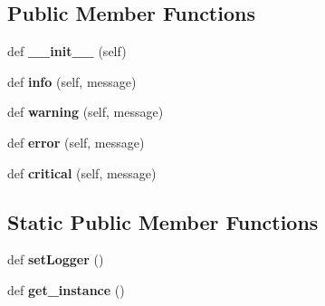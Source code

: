 \subsection*{Public Member Functions}
\begin{DoxyCompactItemize}
\item 
\hypertarget{classsrc_1_1fr_1_1tagc_1_1rainet_1_1core_1_1util_1_1log_1_1Logger_1_1Logger_a8b8db38c1df07ebf8eda30acc9213f04}{}def {\bfseries \+\_\+\+\_\+init\+\_\+\+\_\+} (self)\label{classsrc_1_1fr_1_1tagc_1_1rainet_1_1core_1_1util_1_1log_1_1Logger_1_1Logger_a8b8db38c1df07ebf8eda30acc9213f04}

\item 
\hypertarget{classsrc_1_1fr_1_1tagc_1_1rainet_1_1core_1_1util_1_1log_1_1Logger_1_1Logger_ab5fbcdb8ad161e3e9f1dad276824839c}{}def {\bfseries info} (self, message)\label{classsrc_1_1fr_1_1tagc_1_1rainet_1_1core_1_1util_1_1log_1_1Logger_1_1Logger_ab5fbcdb8ad161e3e9f1dad276824839c}

\item 
\hypertarget{classsrc_1_1fr_1_1tagc_1_1rainet_1_1core_1_1util_1_1log_1_1Logger_1_1Logger_a228c6106085b1ff88bd9c6f20c95e39e}{}def {\bfseries warning} (self, message)\label{classsrc_1_1fr_1_1tagc_1_1rainet_1_1core_1_1util_1_1log_1_1Logger_1_1Logger_a228c6106085b1ff88bd9c6f20c95e39e}

\item 
\hypertarget{classsrc_1_1fr_1_1tagc_1_1rainet_1_1core_1_1util_1_1log_1_1Logger_1_1Logger_a6181f643c1339d15b154c4c8ec3ec86f}{}def {\bfseries error} (self, message)\label{classsrc_1_1fr_1_1tagc_1_1rainet_1_1core_1_1util_1_1log_1_1Logger_1_1Logger_a6181f643c1339d15b154c4c8ec3ec86f}

\item 
\hypertarget{classsrc_1_1fr_1_1tagc_1_1rainet_1_1core_1_1util_1_1log_1_1Logger_1_1Logger_a01b79ca66c78f7c42a8145636595fb34}{}def {\bfseries critical} (self, message)\label{classsrc_1_1fr_1_1tagc_1_1rainet_1_1core_1_1util_1_1log_1_1Logger_1_1Logger_a01b79ca66c78f7c42a8145636595fb34}

\end{DoxyCompactItemize}
\subsection*{Static Public Member Functions}
\begin{DoxyCompactItemize}
\item 
\hypertarget{classsrc_1_1fr_1_1tagc_1_1rainet_1_1core_1_1util_1_1log_1_1Logger_1_1Logger_a8264bb686116fcde3fafac8872915a7d}{}def {\bfseries set\+Logger} ()\label{classsrc_1_1fr_1_1tagc_1_1rainet_1_1core_1_1util_1_1log_1_1Logger_1_1Logger_a8264bb686116fcde3fafac8872915a7d}

\item 
\hypertarget{classsrc_1_1fr_1_1tagc_1_1rainet_1_1core_1_1util_1_1log_1_1Logger_1_1Logger_a07abf08bb9643f57feeba282895f5b1b}{}def {\bfseries get\+\_\+instance} ()\label{classsrc_1_1fr_1_1tagc_1_1rainet_1_1core_1_1util_1_1log_1_1Logger_1_1Logger_a07abf08bb9643f57feeba282895f5b1b}

\end{DoxyCompactItemize}
